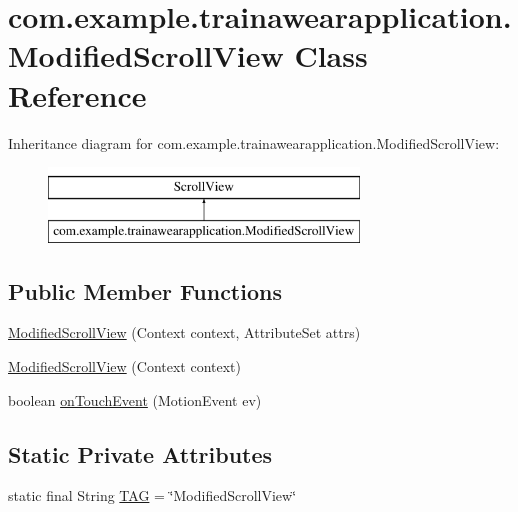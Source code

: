 \hypertarget{classcom_1_1example_1_1trainawearapplication_1_1_modified_scroll_view}{}\section{com.\+example.\+trainawearapplication.\+Modified\+Scroll\+View Class Reference}
\label{classcom_1_1example_1_1trainawearapplication_1_1_modified_scroll_view}
Inheritance diagram for com.\+example.\+trainawearapplication.\+Modified\+Scroll\+View\+:\begin{figure}[H]
\begin{center}
\leavevmode
\includegraphics[height=2.000000cm]{classcom_1_1example_1_1trainawearapplication_1_1_modified_scroll_view}
\end{center}
\end{figure}
\subsection*{Public Member Functions}
\begin{DoxyCompactItemize}
\item 
\mbox{\hyperlink{classcom_1_1example_1_1trainawearapplication_1_1_modified_scroll_view_a54164bcc307ead282e4a872882790ba1}{Modified\+Scroll\+View}} (Context context, Attribute\+Set attrs)
\item 
\mbox{\hyperlink{classcom_1_1example_1_1trainawearapplication_1_1_modified_scroll_view_a60a3e71da3963714f6ec401034a80c6f}{Modified\+Scroll\+View}} (Context context)
\item 
boolean \mbox{\hyperlink{classcom_1_1example_1_1trainawearapplication_1_1_modified_scroll_view_a1183afa31872d9cddf72b967d2db4f12}{on\+Touch\+Event}} (Motion\+Event ev)
\end{DoxyCompactItemize}
\subsection*{Static Private Attributes}
\begin{DoxyCompactItemize}
\item 
static final String \mbox{\hyperlink{classcom_1_1example_1_1trainawearapplication_1_1_modified_scroll_view_aa8c3ba8f3bb238ac0f2d56e82757814a}{T\+AG}} = \char`\"{}Modified\+Scroll\+View\char`\"{}
\end{DoxyCompactItemize}



